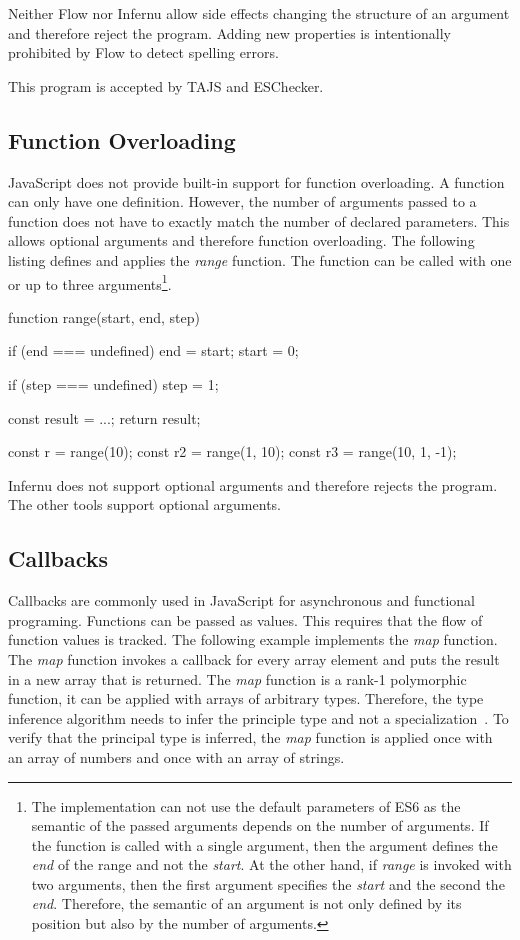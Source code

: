 
Neither Flow nor Infernu allow side effects changing the structure of an argument and therefore reject the program. Adding new properties is intentionally prohibited by Flow to detect spelling errors.

This program is accepted by TAJS and ESChecker.

\subsection{Function Overloading}\label{ssec:function-overloading}
JavaScript does not provide built-in support for function overloading. A function can only have one definition. However, the number of arguments passed to a function does not have to exactly match the number of declared parameters. This allows optional arguments and therefore function overloading. The following listing defines and applies the \textit{range} function. The function can be called with one or up to three arguments\footnote{The implementation can not use the default parameters of ES6 as the semantic of the passed arguments depends on the number of arguments. If the function is called with a single argument, then the argument defines the \textit{end} of the range and not the \textit{start}. At the other hand, if \textit{range} is invoked with two arguments, then the first argument specifies the \textit{start} and the second the \textit{end}. Therefore, the semantic of an argument is not only defined by its position but also by the number of arguments.}. 

\begin{javascriptcode}
function range(start, end, step) {
	if (end === undefined) {
		end = start;
		start = 0;
	}
	
	if (step === undefined) {
		step = 1;
	}
	
	const result = ...;
	return result;
}

const r = range(10);
const r2 = range(1, 10);
const r3 = range(10, 1, -1);	
\end{javascriptcode}

Infernu does not support optional arguments and therefore rejects the program. The other tools support optional arguments.

\subsection{Callbacks}\label{ssec:callbacks}
Callbacks are commonly used in JavaScript for asynchronous and functional programing. Functions can be passed as values. This requires that the flow of function values is tracked. The following example implements the \textit{map} function. The \textit{map} function invokes a callback for every array element and puts the result in a new array that is returned. The \textit{map} function is a rank-1 polymorphic function, it can be applied with arrays of arbitrary types. Therefore, the type inference algorithm needs to infer the principle type and not a specialization~\cite{Pierce2002}. To verify that the principal type is inferred, the \textit{map} function is applied once with an array of numbers and once with an array of strings.

